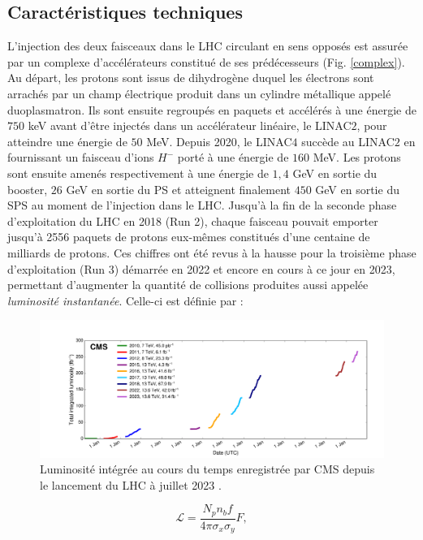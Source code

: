 \subsection{Caractéristiques techniques}

L'injection des deux faisceaux dans le LHC circulant en sens opposés est assurée par un complexe d'accélérateurs constitué de ses prédécesseurs (Fig. \ref{complex}). Au départ, les protons sont issus de dihydrogène duquel les électrons sont arrachés par un champ électrique produit dans un cylindre métallique appelé duoplasmatron. Ils sont ensuite regroupés en paquets et accélérés à une énergie de $750$ keV avant d'être injectés dans un accélérateur linéaire, le LINAC$2$, pour atteindre une énergie de $50$ MeV. Depuis 2020, le LINAC$4$ succède au LINAC$2$ en fournissant un faisceau d'ions $H^-$ porté à une énergie de $160$ MeV. Les protons sont ensuite amenés respectivement à une énergie de $1,4$ GeV en sortie du booster, $26$ GeV en sortie du PS et atteignent finalement $450$ GeV en sortie du SPS au moment de l'injection dans le LHC. Jusqu'à la fin de la seconde phase d'exploitation du LHC en 2018 (Run 2), chaque faisceau pouvait emporter jusqu'à 2556 paquets de protons eux-mêmes constitués d'une centaine de milliards de protons. Ces chiffres ont été revus à la hausse pour la troisième phase d'exploitation (Run 3) démarrée en 2022 et encore en cours à ce jour en 2023, permettant d'augmenter la quantité de collisions produites aussi appelée \textit{luminosité instantanée}. Celle-ci est définie par : 

\begin{figure}
\centering
    \includegraphics[scale=0.4]{Chapitre3/Images/int_lumi_cumulative_pp_3.png} 
\caption{Luminosité intégrée au cours du temps enregistrée par CMS depuis le lancement du LHC à juillet 2023 \cite{LumiTwiki}.}
\label{lumi}
\end{figure}


\begin{equation}
    \mathcal{L}=\frac{N_pn_bf}{4\pi\sigma_x\sigma_y}F,
\end{equation}

